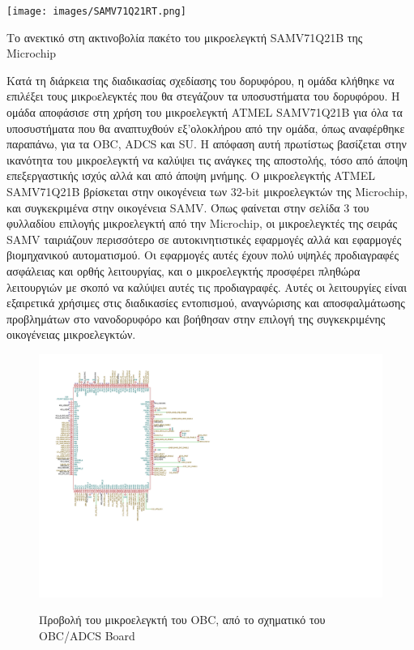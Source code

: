 \documentclass[a4paper,nobib,justified]{tufte-book}
\begin{document}
\begin{marginfigure}
	\centering
	\texttt{[image: images/SAMV71Q21RT.png]}
	\label{fig:samv71-rad-mcu}
	\caption[Το ανεκτικό στη ακτινοβολία πακέτο του μικροελεγκτή SAMV71Q21B της Microchip]{Το ανεκτικό στη ακτινοβολία πακέτο του μικροελεγκτή SAMV71Q21B της Microchip}
\end{marginfigure}

Κατά τη διάρκεια της διαδικασίας σχεδίασης του δορυφόρου, η ομάδα κλήθηκε να επιλέξει τους μικρoελεγκτές που θα στεγάζουν τα υποσυστήματα του δορυφόρου. Η ομάδα αποφάσισε στη χρήση του μικροελεγκτή ATMEL SAMV71Q21B για όλα τα υποσυστήματα που θα αναπτυχθούν εξ'ολοκλήρου από την ομάδα, όπως αναφέρθηκε παραπάνω, για τα OBC, ADCS και SU. Η απόφαση αυτή πρωτίστως βασίζεται στην ικανότητα του μικροελεγκτή να καλύψει τις ανάγκες της αποστολής, τόσο από άποψη επεξεργαστικής ισχύς αλλά και από άποψη μνήμης. Ο μικροελεγκτής ATMEL SAMV71Q21B βρίσκεται στην οικογένεια των 32-bit μικροελεγκτών της Microchip, και συγκεκριμένα στην οικογένεια SAMV. Όπως φαίνεται στην σελίδα 3 του φυλλαδίου επιλογής μικροελεγκτή από την Microchip, οι μικροελεγκτές της σειράς SAMV ταιριάζουν περισσότερο σε αυτοκινητιστικές εφαρμογές αλλά και εφαρμογές βιομηχανικού αυτοματισμού. Οι εφαρμογές αυτές έχουν πολύ υψηλές προδιαγραφές ασφάλειας και ορθής λειτουργίας, και ο μικροελεγκτής προσφέρει πληθώρα λειτουργιών με σκοπό να καλύψει αυτές τις προδιαγραφές. Αυτές οι λειτουργίες είναι εξαιρετικά χρήσιμες στις διαδικασίες εντοπισμού, αναγνώρισης και αποσφαλμάτωσης προβλημάτων στο νανοδορυφόρο και βοήθησαν στην επιλογή της συγκεκριμένης οικογένειας μικροελεγκτών.

\begin{figure}[hb]
	\includegraphics[width=0.8\linewidth]{media/diagrams/obc-mcu-schematic.pdf}
	\label{diag:obc-mcu-schematic}
	\caption{Προβολή του μικροελεγκτή του OBC, από το σχηματικό του OBC/ADCS Board}
\end{figure}
\end{document}
